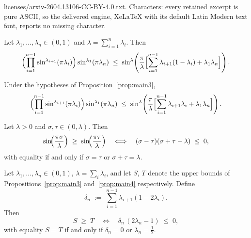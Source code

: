 \documentclass[10pt,a4paper]{amsart}
\begin{document}
licenses/arxiv-2604.13106-CC-BY-4.0.txt. Characters: every retained excerpt is pure ASCII, so the delivered engine, XeLaTeX with its default Latin Modern text font, reports no missing character.
\begin{proposition}\label{prop:main3}
Let $\lambda_1,\ldots,\lambda_n\in(0,1)$ and
$\lambda=\displaystyle\sum_{i=1}^n\lambda_i$.  Then
\begin{equation}\label{eq:propmain3}
  \Bigl(\prod_{i=1}^{n-1}\sin^{\lambda_{i+1}}(\pi\lambda_i)\Bigr)
  \sin^{\lambda_1}(\pi\lambda_n)
  \;\leq\;
  \sin^\lambda\!\left(\frac\pi\lambda
  \Bigl[\sum_{i=1}^{n-1}\lambda_{i+1}(1-\lambda_i)+\lambda_1\lambda_n
  \Bigr]\right).
\end{equation}
\end{proposition}

\begin{proposition}\label{prop:main4}
Under the hypotheses of Proposition~\ref{prop:main3},
\begin{equation}\label{eq:propmain4}
  \Bigl(\prod_{i=1}^{n-1}\sin^{\lambda_{i+1}}(\pi\lambda_i)\Bigr)
  \sin^{\lambda_1}(\pi\lambda_n)
  \;\leq\;
  \sin^\lambda\!\left(\frac\pi\lambda
  \Bigl[\sum_{i=1}^{n-1}\lambda_{i+1}\lambda_i+\lambda_1\lambda_n
  \Bigr]\right).
\end{equation}
\end{proposition}

\begin{lemma}\label{lem:sincompare}
Let $\lambda>0$ and $\sigma,\tau\in(0,\lambda)$.  Then
\[
  \sin\!\Bigl(\frac{\pi\sigma}{\lambda}\Bigr)
  \;\geq\;
  \sin\!\Bigl(\frac{\pi\tau}{\lambda}\Bigr)
  \quad\Longleftrightarrow\quad
  (\sigma-\tau)(\sigma+\tau-\lambda)\;\leq\;0,
\]
with equality if and only if $\sigma=\tau$ or $\sigma+\tau=\lambda$.
\end{lemma}

\begin{theorem}\label{thm:compare_n}
Let $\lambda_1,\ldots,\lambda_n\in(0,1)$, $\lambda=\sum_i\lambda_i$,
and let $S$, $T$ denote the upper bounds of
Propositions~\ref{prop:main3} and~\ref{prop:main4} respectively.
Define
\begin{equation}\label{eq:delta_n}
  \delta_n \;:=\; \sum_{i=1}^{n-1}\lambda_{i+1}(1-2\lambda_i).
\end{equation}
Then
\begin{equation}\label{eq:compare_n}
  S \;\geq\; T
  \quad\Longleftrightarrow\quad
  \delta_n\,(2\lambda_n-1) \;\leq\; 0,
\end{equation}
with equality $S=T$ if and only if $\delta_n=0$ or $\lambda_n=\tfrac12$.
\end{theorem}
\end{document}
